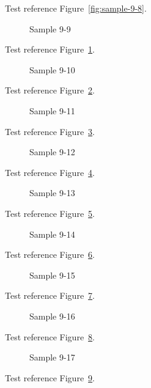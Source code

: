 Test reference Figure~\ref{fig:sample-9-8}.

\begin{figure}[tbhp]
\caption{Sample 9-9}
\label{fig:sample-9-9}
\end{figure}

Test reference Figure~\ref{fig:sample-9-9}.

\begin{figure}[tbhp]
\caption{Sample 9-10}
\label{fig:sample-9-10}
\end{figure}

Test reference Figure~\ref{fig:sample-9-10}.

\begin{figure}[tbhp]
\caption{Sample 9-11}
\label{fig:sample-9-11}
\end{figure}

Test reference Figure~\ref{fig:sample-9-11}.

\begin{figure}[tbhp]
\caption{Sample 9-12}
\label{fig:sample-9-12}
\end{figure}

Test reference Figure~\ref{fig:sample-9-12}.

\begin{figure}[tbhp]
\caption{Sample 9-13}
\label{fig:sample-9-13}
\end{figure}

Test reference Figure~\ref{fig:sample-9-13}.

\begin{figure}[tbhp]
\caption{Sample 9-14}
\label{fig:sample-9-14}
\end{figure}

Test reference Figure~\ref{fig:sample-9-14}.

\begin{figure}[tbhp]
\caption{Sample 9-15}
\label{fig:sample-9-15}
\end{figure}

Test reference Figure~\ref{fig:sample-9-15}.

\begin{figure}[tbhp]
\caption{Sample 9-16}
\label{fig:sample-9-16}
\end{figure}

Test reference Figure~\ref{fig:sample-9-16}.

\begin{figure}[tbhp]
\caption{Sample 9-17}
\label{fig:sample-9-17}
\end{figure}

Test reference Figure~\ref{fig:sample-9-17}.

